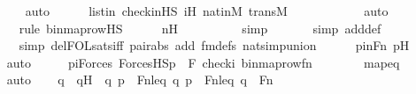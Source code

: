 \begin{isabellebody}
\ \ \ \ \ \ \ \isamarkupfalse%
\ auto{\isacharbrackleft}{\kern0pt}{}{\isacharbrackright}{\kern0pt}\isanewline
\ \ \ \ \isamarkupfalse%
\ listin\ check{\isacharunderscore}{\kern0pt}in{\isacharunderscore}{\kern0pt}HS\ iH\ nat{\isacharunderscore}{\kern0pt}in{\isacharunderscore}{\kern0pt}M\ transM\ \isanewline
\ \ \ \ \ \ \ \ \ \isamarkupfalse%
\ auto{\isacharbrackleft}{\kern0pt}{}{\isacharbrackright}{\kern0pt}\isanewline
\ \ \ \ \ \ \ \isamarkupfalse%
{\isacharparenleft}{\kern0pt}rule\ binmap{\isacharunderscore}{\kern0pt}row{\isacharprime}{\kern0pt}{\isacharunderscore}{\kern0pt}HS{\isacharparenright}{\kern0pt}\isanewline
\ \ \ \ \isamarkupfalse%
\ nH\ \isanewline
\ \ \ \ \ \ \ \isamarkupfalse%
\ simp\isanewline
\ \ \ \ \ \ \isamarkupfalse%
{\isacharparenleft}{\kern0pt}simp\ add{\isacharcolon}{\kern0pt}{\isasymphi}{\isacharunderscore}{\kern0pt}def{\isacharparenright}{\kern0pt}\isanewline
\ \ \ \ \ \ \isamarkupfalse%
\ {\isacharparenleft}{\kern0pt}simp\ del{\isacharcolon}{\kern0pt}FOL{\isacharunderscore}{\kern0pt}sats{\isacharunderscore}{\kern0pt}iff\ pair{\isacharunderscore}{\kern0pt}abs\ add{\isacharcolon}{\kern0pt}\ fm{\isacharunderscore}{\kern0pt}defs\ nat{\isacharunderscore}{\kern0pt}simp{\isacharunderscore}{\kern0pt}union{\isacharparenright}{\kern0pt}\isanewline
\ \ \ \ \isamarkupfalse%
\ pinFn\ pH\ \isanewline
\ \ \ \ \isamarkupfalse%
\ auto\isanewline
\ \ \isamarkupfalse%
\ \isamarkupfalse%
\ piForces{\isacharcolon}{\kern0pt}\ {\isachardoublequoteopen}ForcesHS{\isacharparenleft}{\kern0pt}{\isasympi}{\isacharbackquote}{\kern0pt}p{\isacharcomma}{\kern0pt}\ {\isasymphi}{\isacharcomma}{\kern0pt}\ {\isacharbrackleft}{\kern0pt}F{\isacharprime}{\kern0pt}{\isacharcomma}{\kern0pt}\ check{\isacharparenleft}{\kern0pt}i{\isacharparenright}{\kern0pt}{\isacharcomma}{\kern0pt}\ binmap{\isacharunderscore}{\kern0pt}row{\isacharprime}{\kern0pt}{\isacharparenleft}{\kern0pt}f{\isacharbackquote}{\kern0pt}n{\isacharparenright}{\kern0pt}{\isacharbrackright}{\kern0pt}{\isacharparenright}{\kern0pt}{\isachardoublequoteclose}\ \ \isanewline
\ \ \ \ \isamarkupfalse%
\ mapeq\ \isanewline
\ \ \ \ \isamarkupfalse%
\ auto\isanewline
\isanewline
\ \ \isamarkupfalse%
\ q\ \ qH\ {\isacharcolon}{\kern0pt}\ {\isachardoublequoteopen}{\isacharless}{\kern0pt}q{\isacharcomma}{\kern0pt}\ p{\isachargreater}{\kern0pt}\ {\isasymin}\ Fn{\isacharunderscore}{\kern0pt}leq{\isachardoublequoteclose}\ {\isachardoublequoteopen}{\isacharless}{\kern0pt}q{\isacharcomma}{\kern0pt}\ {\isasympi}{\isacharbackquote}{\kern0pt}p{\isachargreater}{\kern0pt}\ {\isasymin}\ Fn{\isacharunderscore}{\kern0pt}leq{\isachardoublequoteclose}\ {\isachardoublequoteopen}q\ {\isasymin}\ Fn{\isachardoublequoteclose}\ \isanewline

\end{isabellebody}

